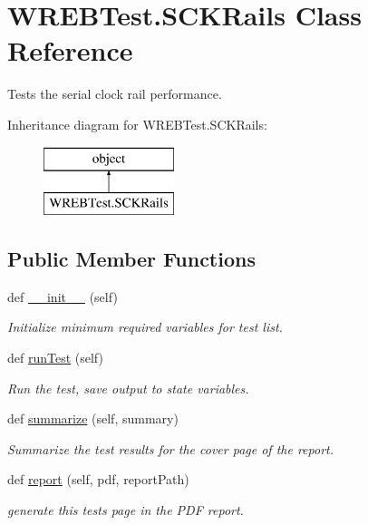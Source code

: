 \hypertarget{class_w_r_e_b_test_1_1_s_c_k_rails}{}\section{W\+R\+E\+B\+Test.\+S\+C\+K\+Rails Class Reference}
\label{class_w_r_e_b_test_1_1_s_c_k_rails}


Tests the serial clock rail performance.  


Inheritance diagram for W\+R\+E\+B\+Test.\+S\+C\+K\+Rails\+:\begin{figure}[H]
\begin{center}
\leavevmode
\includegraphics[height=2.000000cm]{class_w_r_e_b_test_1_1_s_c_k_rails}
\end{center}
\end{figure}
\subsection*{Public Member Functions}
\begin{DoxyCompactItemize}
\item 
def \hyperlink{class_w_r_e_b_test_1_1_s_c_k_rails_a3b97f57578a878d60be2dc318b75ec40}{\+\_\+\+\_\+init\+\_\+\+\_\+} (self)
\begin{DoxyCompactList}\small\item\em Initialize minimum required variables for test list. \end{DoxyCompactList}\item 
def \hyperlink{class_w_r_e_b_test_1_1_s_c_k_rails_a545777a2849f4e2262d16432d209e128}{run\+Test} (self)
\begin{DoxyCompactList}\small\item\em Run the test, save output to state variables. \end{DoxyCompactList}\item 
def \hyperlink{class_w_r_e_b_test_1_1_s_c_k_rails_a6a3308b1318ead9249d8e14f521976c7}{summarize} (self, summary)
\begin{DoxyCompactList}\small\item\em Summarize the test results for the cover page of the report. \end{DoxyCompactList}\item 
def \hyperlink{class_w_r_e_b_test_1_1_s_c_k_rails_a09af6bfd2a19ee745faa2184f67415f7}{report} (self, pdf, report\+Path)
\begin{DoxyCompactList}\small\item\em generate this test\textquotesingle{}s page in the P\+DF report. \end{DoxyCompactList}\end{DoxyCompactItemize}


